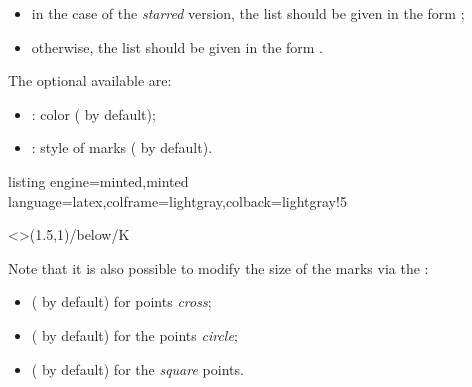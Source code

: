 \documentclass[11pt,a4paper]{ltxdoc}
\begin{document}
\begin{itemize}
	\item in the case of the \textit{starred} version, the list should be given in the form ;
	\item otherwise, the list should be given in the form .
\end{itemize}

\smallskip

The optional \MontreCode{[keys]} available are:

\smallskip

\begin{itemize}
	\item {}: color ( by default);
	\item {}: style of marks ( by default).
\end{itemize}

\begin{tcblisting}{listing engine=minted,minted language=latex,colframe=lightgray,colback=lightgray!5}
\begin{GraphTikz}[x=1.5cm,y=1.5cm,Ymin=-2]
	\MarkPts[Color=orange,Style=+]<\small\sffamily>{(1.5,1)/below/K} %
\end{GraphTikz}
\end{tcblisting}

Note that it is also possible to modify the size of the  marks via the \MontreCode{[keys]}:

\begin{itemize}
	\item {} (\MontreCode{2pt} by default) for points \textit{cross};
	\item {} (\MontreCode{1.75pt} by default) for the points \textit{circle};
	\item {} (\MontreCode{2pt} by default) for the \textit{square} points.
\end{itemize}
\end{document}
